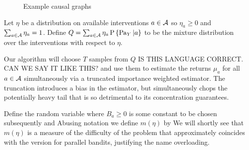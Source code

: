\begin{figure}
    \begin{subfigure}[b]{0.3\textwidth}
        \caption{}
        \label{fig:causalStructure_confounded}
    \end{subfigure}
    \begin{subfigure}[b]{0.69\textwidth}
        \caption{}
        \label{fig:causalchain}
    \end{subfigure}
    \caption{Example causal graphs}\label{fig:animals}
\end{figure}

Let $\eta$ be a distribution on available interventions $a \in \mathcal A$ so $\eta_a \geq 0$ and $\sum_{a \in \mathcal A} \eta_a = 1$.
Define $Q = \sum_{a \in \mathcal A} \eta_a \operatorname{P}\left\{\operatorname{Pa}_{Y}|a\right\}$ to be the mixture distribution over the interventions with respect to $\eta$.

Our algorithm will choose $T$ samples from $Q$ IS THIS LANGUAGE CORRECT. CAN WE SAY IT LIKE THIS? and use them to estimate the returns $\mu_a$ for all $a \in \mathcal A$ simultaneously via a truncated importance weighted estimator. The truncation introduces a bias in the estimator, but simultaneously chops the potentially heavy tail that is so detrimental to its concentration guarantees. 

Define the random variable
where $B_a \geq 0$ is some constant to be chosen subsequently and
Abusing notation we define $m(\eta)$ by
We will shortly see that $m(\eta)$ is a measure of the difficulty of the problem that approximately 
coincides with the version for parallel bandits, justifying the name overloading.

